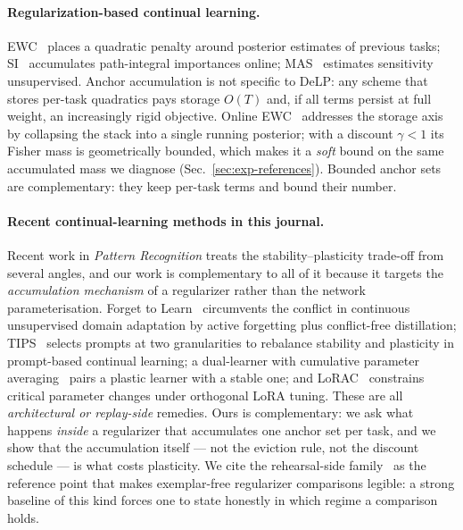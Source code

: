 \documentclass[review,12pt,number]{elsarticle}
\newcommand{\delp}{DeLP}
\begin{document}
\begin{sloppypar}
\paragraph{Regularization-based continual learning.}
EWC~\cite{kirkpatrick2017} places a quadratic penalty around posterior
estimates of previous tasks; SI~\cite{zenke2017} accumulates
path-integral importances online; MAS~\cite{aljundi2018} estimates
sensitivity unsupervised. Anchor accumulation is not specific to
\delp{}: any scheme that stores per-task quadratics pays storage
$O(T)$ and, if all terms persist at full weight, an increasingly
rigid objective. Online EWC~\cite{chaudhry2018} addresses the storage
axis by collapsing the stack into a single running posterior; with a
discount $\gamma{<}1$ its Fisher mass is geometrically bounded, which
makes it a \emph{soft} bound on the same accumulated mass we diagnose
(Sec.~\ref{sec:exp-references}). Bounded anchor sets are complementary:
they keep per-task terms and bound their number.

\paragraph{Recent continual-learning methods in this journal.}
Recent work in \emph{Pattern Recognition} treats the
stability--plasticity trade-off from several angles, and our work is
complementary to all of it because it targets the \emph{accumulation
mechanism} of a regularizer rather than the network parameterisation.
Forget to Learn~\cite{hassan2025f2l} circumvents the conflict in
continuous unsupervised domain adaptation by active forgetting plus
conflict-free distillation; {TIPS}~\cite{feng2026tips} selects prompts at
two granularities to rebalance stability and plasticity in prompt-based
continual learning; a dual-learner with cumulative parameter
averaging~\cite{sun2026dlcpa} pairs a plastic learner with a stable one;
and {LoRAC}~\cite{ling2026lorac} constrains critical parameter changes
under orthogonal {LoRA} tuning. These are all \emph{architectural or
replay-side} remedies. Ours is complementary: we ask what happens
\emph{inside} a regularizer that accumulates one anchor set per task,
and we show that the accumulation itself --- not the eviction rule,
not the discount schedule --- is what costs plasticity. We cite the
rehearsal-side family~\cite{buzzega2020der} as the reference point that
makes exemplar-free regularizer comparisons legible: a strong baseline
of this kind forces one to state honestly in which regime a comparison
holds.
\end{sloppypar}
\end{document}
